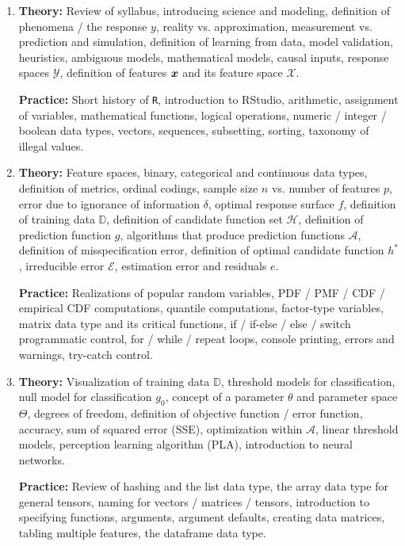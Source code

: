 \documentclass[12pt]{article}
\begin{document}
\begin{enumerate}[(1)]
\item \textbf{Theory:} Review of syllabus, introducing science and modeling, definition of phenomena / the response $y$, reality vs. approximation, measurement vs. prediction and simulation, definition of learning from data, model validation, heuristics, ambiguous models, mathematical models, causal inputs, response spaces $\mathcal{Y}$, definition of features $\boldsymbol{x}$ and its feature space $\mathcal{X}$.

\textbf{Practice:} Short history of \texttt{R}, introduction to RStudio, arithmetic, assignment of variables, mathematical functions, logical operations, numeric / integer / boolean data types, vectors, sequences, subsetting, sorting, taxonomy of illegal values.

\item \textbf{Theory:} Feature spaces, binary, categorical and continuous data types, definition of metrics, ordinal codings, sample size $n$ vs. number of features $p$, error due to ignorance of information $\delta$, optimal response surface $f$, definition of training data $\mathbb{D}$, definition of candidate function set $\mathcal{H}$, definition of prediction function $g$, algorithms that produce prediction functions $\mathcal{A}$, definition of misspecification error, definition of optimal candidate function $h^*$, irreducible error $\mathcal{E}$, estimation error and residuals $e$.

\textbf{Practice:} Realizations of popular random variables, PDF / PMF / CDF / empirical CDF computations, quantile computations, factor-type variables, matrix data type and its critical functions, if / if-else / else / switch programmatic control, for / while / repeat loops, console printing, errors and warnings, try-catch control.

\item \textbf{Theory:} Visualization of training data $\mathbb{D}$, threshold models for classification, null model for classification $g_0$, concept of a parameter $\theta$ and parameter space $\Theta$, degrees of freedom, definition of objective function / error function, accuracy, sum of squared error (SSE), optimization within $\mathcal{A}$, linear threshold models, perception learning algorithm (PLA), introduction to neural networks.

\textbf{Practice:} Review of hashing and the list data type, the array data type for general tensors, naming for vectors / matrices / tensors, introduction to specifying functions, arguments, argument defaults, creating data matrices, tabling multiple features, the dataframe data type.


\end{enumerate}
\end{document}
